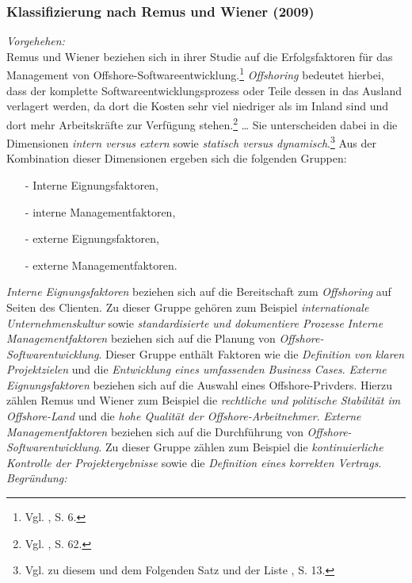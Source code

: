 \noindent
\subsubsection{Klassifizierung nach Remus und Wiener (2009)}
\textit{Vorgehehen:}\\\noindent
Remus und Wiener beziehen sich in ihrer Studie auf die Erfolgsfaktoren für das Management von Offshore-Softwareentwicklung.\footnote{Vgl. \cite{Remus.2009}, S. 6.}
\textit{Offshoring} bedeutet hierbei, dass der komplette Softwareentwicklungsprozess oder Teile dessen in das Ausland verlagert werden,
da dort die Kosten sehr viel niedriger als im Inland sind und dort mehr Arbeitskräfte zur Verfügung stehen.\footnote{Vgl. \cite{Krishna.2004}, S. 62.}
\ldots
Sie unterscheiden dabei in die Dimensionen \textit{intern versus extern} sowie \textit{statisch versus dynamisch}.\footnote{Vgl. zu diesem und dem Folgenden Satz und der Liste \cite{Remus.2009}, S. 13.} 
Aus der Kombination dieser Dimensionen ergeben sich die folgenden Gruppen:
\begin{itemize}\itemsep0pt
\item[-]Interne Eignungsfaktoren,
\item[-]interne Managementfaktoren,
\item[-]externe Eignungsfaktoren,
\item[-]externe Managementfaktoren.
\end{itemize}
\textit{Interne Eignungsfaktoren} beziehen sich auf die Bereitschaft zum \textit{Offshoring} auf Seiten des Clienten.
Zu dieser Gruppe gehören zum Beispiel \textit{internationale Unternehmenskultur} sowie \textit{standardisierte und dokumentiere Prozesse}
\textit{Interne Managementfaktoren} beziehen sich auf die Planung von \textit{Offshore-Softwarentwicklung}.
Dieser Gruppe enthält Faktoren wie die \textit{Definition von klaren Projektzielen} und die \textit{Entwicklung eines umfassenden Business Cases}.
\textit{Externe Eignungsfaktoren} beziehen sich auf die Auswahl eines Offshore-Privders.
Hierzu zählen Remus und Wiener zum Beispiel die \textit{rechtliche und politische Stabilität im Offshore-Land} und die \textit{hohe Qualität der Offshore-Arbeitnehmer}.
\textit{Externe Managementfaktoren} beziehen sich auf die Durchführung von \textit{Offshore-Softwarentwicklung}.
Zu dieser Gruppe zählen zum Beispiel die \textit{kontinuierliche Kontrolle der Projektergebnisse} sowie die \textit{Definition eines korrekten Vertrags}.
\\\noindent
\textit{Begründung:}\\\noindent